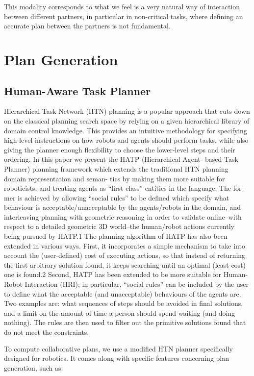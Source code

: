 This modality corresponds to what we feel is a very natural way of
interaction between different partners, in particular in non-critical
tasks, where defining an accurate plan between the partners is not
fundamental. 


\section{Plan Generation}
\subsection{Human-Aware Task Planner}
Hierarchical Task Network (HTN) planning is a popular approach that cuts down on the classical planning search space
by relying on a given hierarchical library of domain control knowledge. This provides an intuitive methodology for
specifying high-level instructions on how robots and agents should perform tasks, while also giving the planner enough 
flexibility to choose the lower-level steps and their ordering. In this paper we present the HATP (Hierarchical Agent-
based Task Planner) planning framework which extends the traditional HTN planning domain representation and seman-
tics by making them more suitable for roboticists, and treating agents as “first class” entities in the language. The for-
mer is achieved by allowing “social rules” to be defined which specify what behaviour is acceptable/unacceptable by
the agents/robots in the domain, and interleaving planning with geometric reasoning in order to validate online–with
respect to a detailed geometric 3D world–the human/robot actions currently being pursued by HATP.1
The planning algorithm of HATP has also been extended in various ways. First, it incorporates a simple mechanism
to take into account the (user-defined) cost of executing actions, so that instead of returning the first arbitrary solution
found, it keeps searching until an optimal (least-cost) one is found.2 Second, HATP has been extended to be more
suitable for Human-Robot Interaction (HRI); in particular, “social rules” can be included by the user to define what
the acceptable (and unacceptable) behaviours of the agents are. Two examples are: what sequences of steps should be
avoided in final solutions, and a limit on the amount of time a person should spend waiting (and doing nothing). The rules
are then used to filter out the primitive solutions found that do not meet the constraints.

To compute collaborative plans, we use a modified HTN planner specifically designed for robotics.
It comes along with specific features concerning plan generation, such as:

